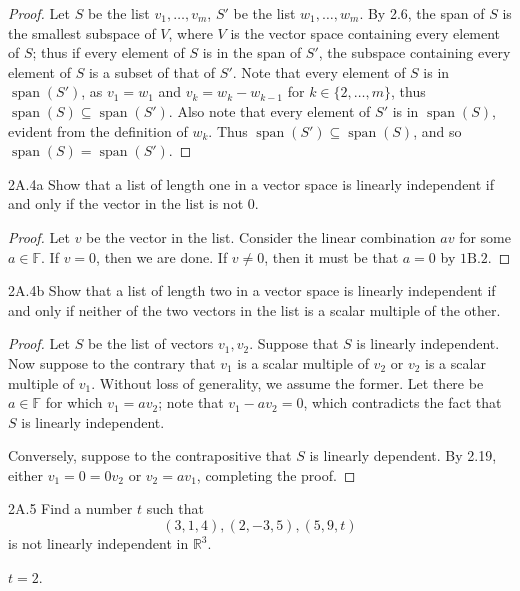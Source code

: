 \documentclass{exam}
\DeclareMathOperator{\spn}{span}
\begin{document}
\begin{proof}
    Let $S$ be the list $v_1,\dots,v_m$, $S'$ be the list $w_1, \dots, w_m$. By 2.6, the span of $S$ is the smallest subspace of $V$, where $V$ is the vector space containing every element of $S$; thus if every element of $S$ is in the span of $S'$, the subspace containing every element of $S$ is a subset of that of $S'$. Note that every element of $S$ is in $\spn(S')$, as $v_1 = w_1$ and $v_k = w_k - w_{k-1}$ for $k\in\{2,\dots,m\}$, thus $\spn(S)\subseteq\spn(S')$. Also note that every element of $S'$ is in $\spn(S)$, evident from the definition of $w_k$. Thus $\spn(S')\subseteq\spn(S)$, and so $\spn(S) =\spn(S')$.
\end{proof}

\begin{problem}{2A.4a}
    Show that a list of length one in a vector space is linearly independent if and only if the vector in the list is not $0$.
\end{problem}

\begin{proof}
    Let $v$ be the vector in the list. Consider the linear combination $av$ for some $a\in\mathbb F$. If $v = 0$, then we are done. If $v\neq0$, then it must be that $a = 0$ by $\mathrm{1B.2}$.
\end{proof}

\begin{problem}{2A.4b}
    Show that a list of length two in a vector space is linearly independent if and only if neither of the two vectors in the list is a scalar multiple of the other.
\end{problem}

\begin{proof}
    Let $S$ be the list of vectors $v_1, v_2$. Suppose that $S$ is linearly independent. Now suppose to the contrary that $v_1$ is a scalar multiple of $v_2$ or $v_2$ is a scalar multiple of $v_1$. Without loss of generality, we assume the former. Let there be $a\in\mathbb F$ for which $v_1 = av_2$; note that $v_1 - av_2 = 0$, which contradicts the fact that $S$ is linearly independent.

    Conversely, suppose to the contrapositive that $S$ is linearly dependent. By 2.19, either $v_1=0=0v_2$ or $v_2=av_1$, completing the proof.
\end{proof}

\begin{problem}{2A.5}
    Find a number $t$ such that \[
        (3, 1, 4), (2, -3, 5), (5, 9, t)
    \]
    is not linearly independent in $\mathbb R^3$.
\end{problem}
$t = 2$.
\end{document}
